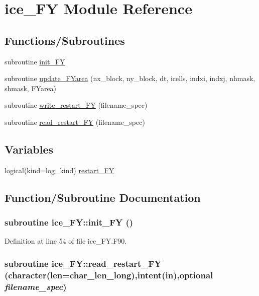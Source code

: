 \hypertarget{namespaceice__FY}{
\section{ice\_\-FY Module Reference}
\label{namespaceice__FY}
}
\subsection*{Functions/Subroutines}
\begin{DoxyCompactItemize}
\item 
subroutine \hyperlink{namespaceice__FY_a91a650e4ced6612c0ab978f8b8a0c5b7}{init\_\-FY}
\item 
subroutine \hyperlink{namespaceice__FY_a4f6f4b6c28b7204e48d62a0383b1497c}{update\_\-FYarea} (nx\_\-block, ny\_\-block, dt, icells, indxi, indxj, nhmask, shmask, FYarea)
\item 
subroutine \hyperlink{namespaceice__FY_af12be2c743dc7e04389c68e276903b94}{write\_\-restart\_\-FY} (filename\_\-spec)
\item 
subroutine \hyperlink{namespaceice__FY_a5befdd0bd7ac80faa33cfc53cff646a7}{read\_\-restart\_\-FY} (filename\_\-spec)
\end{DoxyCompactItemize}
\subsection*{Variables}
\begin{DoxyCompactItemize}
\item 
logical(kind=log\_\-kind) \hyperlink{namespaceice__FY_a883caa24304b985bea44b09d23c22068}{restart\_\-FY}
\end{DoxyCompactItemize}


\subsection{Function/Subroutine Documentation}
\hypertarget{namespaceice__FY_a91a650e4ced6612c0ab978f8b8a0c5b7}{
\subsubsection[{init\_\-FY}]{\setlength{\rightskip}{0pt plus 5cm}subroutine ice\_\-FY::init\_\-FY ()}}
\label{namespaceice__FY_a91a650e4ced6612c0ab978f8b8a0c5b7}


Definition at line 54 of file ice\_\-FY.F90.\hypertarget{namespaceice__FY_a5befdd0bd7ac80faa33cfc53cff646a7}{
\subsubsection[{read\_\-restart\_\-FY}]{\setlength{\rightskip}{0pt plus 5cm}subroutine ice\_\-FY::read\_\-restart\_\-FY (character(len=char\_\-len\_\-long),intent(in),optional {\em filename\_\-spec})}}
\label{namespaceice__FY_a5befdd0bd7ac80faa33cfc53cff646a7}


